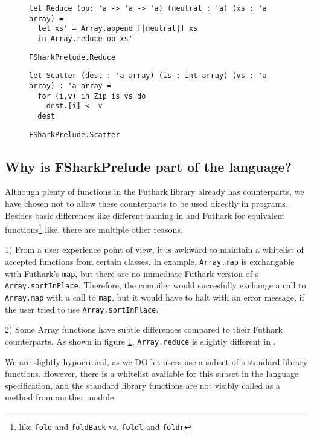 \begin{figure}[H]
\begin{verbatim}
let Reduce (op: 'a -> 'a -> 'a) (neutral : 'a) (xs : 'a array) =
  let xs' = Array.append [|neutral|] xs
  in Array.reduce op xs'
\end{verbatim}
\caption{\texttt{FSharkPrelude.Reduce}}
\label{fig:fsharkpreludereduce}
\end{figure}

\begin{figure}[H]
\begin{verbatim}
let Scatter (dest : 'a array) (is : int array) (vs : 'a array) : 'a array =
  for (i,v) in Zip is vs do
    dest.[i] <- v
  dest
\end{verbatim}
\caption{\texttt{FSharkPrelude.Scatter}}
\label{fig:fsharkpreludescatter}
\end{figure}
\clearpage

\subsection*{Why is FSharkPrelude part of the \fshark{} language?}
Although plenty of functions in the Futhark library already has \fsharp{}
counterparts, we have chosen not to allow these \fsharp{} counterparts to be
used directly in \fshark{} programs.
Besides basic differences like different naming in \fsharp{} and Futhark for
equivalent functions\footnote{like \texttt{fold} and \texttt{foldBack} vs.
  \texttt{foldl} and \texttt{foldr}} like, there are multiple other reasons.

1) From a user experience point of view, it is awkward to maintain a whitelist
of accepted functions from certain classes.
In example, \texttt{Array.map} is exchangable with Futhark's
\texttt{map}, but there are no immediate Futhark version of \fsharp{}s
\texttt{Array.sortInPlace}. Therefore, the \fshark{} compiler would succesfully
exchange a call to \texttt{Array.map} with a call to \texttt{map}, but it would
have to halt with an error message, if the user tried to use \texttt{Array.sortInPlace}.

2) Some Array functions have subtle differences compared to their
Futhark counterparts. As shown in figure \ref{fig:fsharkpreludereduce},
\texttt{Array.reduce} is slightly different in \fsharp{}.

We are slightly hypocritical, as we DO let users use a subset of \fsharp{}s
standard library functions. However, there is a whitelist available for this
subset in the \fshark{} language specification, and the standard library
functions are not visibly called as a method from another module.

